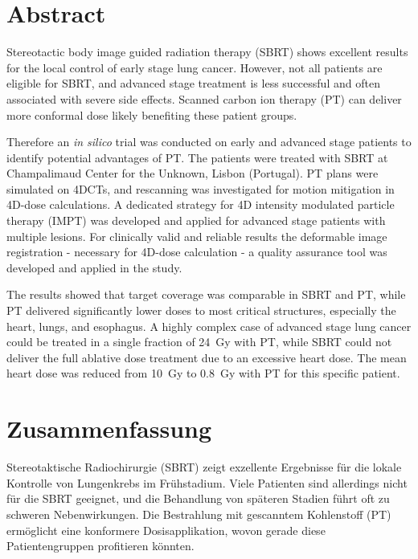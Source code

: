 \section*{Abstract}


Stereotactic body image guided radiation therapy (SBRT) shows excellent results for the local control of early stage lung cancer. 
However, not all patients are eligible for SBRT, and advanced stage treatment is less successful and often associated with severe side effects. 
Scanned carbon ion therapy (PT) can deliver more conformal dose likely benefiting these patient groups.

Therefore an \textit{in silico} trial was conducted on early and advanced stage patients to identify potential advantages of PT. 
The patients were treated with SBRT at Champalimaud Center for the Unknown, Lisbon (Portugal). PT plans were simulated on 4DCTs, 
and rescanning was investigated for motion mitigation in 4D-dose calculations. A dedicated strategy for 4D intensity modulated particle therapy (IMPT)
was developed and applied for advanced stage patients with multiple lesions. For clinically valid and reliable results the deformable 
image registration - necessary for 4D-dose calculation - a quality assurance tool was developed and applied in the study.

The results showed that target coverage was comparable in SBRT and PT, while PT delivered significantly lower doses to 
most critical structures, especially the heart, lungs, and esophagus. A highly complex case of advanced stage lung cancer could be treated
in a single fraction of 24~Gy with PT, while SBRT could not deliver the full ablative dose treatment due to an excessive heart dose.
The mean heart dose was reduced from 10~Gy to 0.8~Gy with PT for this specific patient.



\newpage

\section*{Zusammenfassung}

Stereotaktische Radiochirurgie (SBRT) zeigt exzellente Ergebnisse f\"{u}r die lokale Kontrolle von 
Lungenkrebs im Fr\"{u}hstadium. Viele Patienten sind allerdings nicht f\"{u}r die SBRT geeignet, und die 
Behandlung von sp\"{a}teren Stadien f\"{u}hrt oft zu schweren Nebenwirkungen. Die Bestrahlung mit gescanntem 
Kohlenstoff (PT) erm\"{o}glicht eine konformere Dosisapplikation, wovon gerade diese Patientengruppen 
profitieren k\"{o}nnten.

